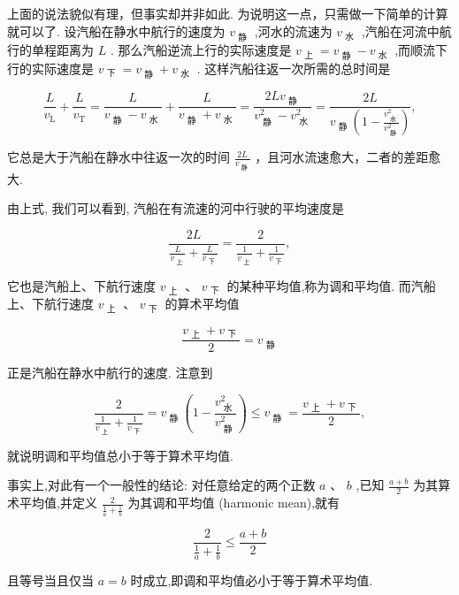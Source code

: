 \documentclass[10pt]{article}
\begin{document}
上面的说法貌似有理，但事实却并非如此. 为说明这一点，只需做一下简单的计算就可以了. 设汽船在静水中航行的速度为 \({v}_{\text{ 静 }}\) ,河水的流速为 \({v}_{\text{ 水 }}\) ,汽船在河流中航行的单程距离为 \(L\) . 那么汽船逆流上行的实际速度是 \({v}_{\mathrm{\text{ 上 }}} = {v}_{\text{ 静 }} - {v}_{\text{ 水 }}\) ,而顺流下行的实际速度是 \({v}_{\mathrm{\text{ 下 }}} = {v}_{\text{ 静 }} + {v}_{\text{ 水 }}\) . 这样汽船往返一次所需的总时间是

\[
\frac{L}{{v}_{\mathrm{L}}} + \frac{L}{{v}_{\mathrm{T}}} = \frac{L}{{v}_{\mathrm{\text{ 静 }}} - {v}_{\mathrm{\text{ 水 }}}} + \frac{L}{{v}_{\mathrm{\text{ 静 }}} + {v}_{\mathrm{\text{ 水 }}}} = \frac{{2L}{v}_{\mathrm{\text{ 静 }}}}{{v}_{\mathrm{\text{ 静 }}}^{2} - {v}_{\mathrm{\text{ 水 }}}^{2}} = \frac{2L}{{v}_{\mathrm{\text{ 静 }}}\left( {1 - \frac{{v}_{\mathrm{\text{ 水 }}}^{2}}{{v}_{\mathrm{\text{ 静 }}}^{2}}}\right) },
\]

它总是大于汽船在静水中往返一次的时间 \(\frac{2L}{{v}_{\text{ 静 }}}\) ，且河水流速愈大，二者的差距愈大.

由上式, 我们可以看到, 汽船在有流速的河中行驶的平均速度是

\[
\frac{2L}{\frac{L}{{v}_{\mathrm{\text{ 上 }}}} + \frac{L}{{v}_{\mathrm{\text{ 下 }}}}} = \frac{2}{\frac{1}{{v}_{\mathrm{\text{ 上 }}}} + \frac{1}{{v}_{\mathrm{\text{ 下 }}}}},
\]

它也是汽船上、下航行速度 \({v}_{\text{ 上 }}\text{ 、 }{v}_{\text{ 下 }}\) 的某种平均值,称为调和平均值. 而汽船上、下航行速度 \({v}_{\text{ 上 }}\text{ 、 }{v}_{\text{ 下 }}\) 的算术平均值

\[
\frac{{v}_{\text{ 上 }} + {v}_{\text{ 下 }}}{2} = {v}_{\text{ 静 }}
\]

正是汽船在静水中航行的速度. 注意到

\[
\frac{2}{\frac{1}{{v}_{\mathrm{\text{ 上 }}}} + \frac{1}{{v}_{\mathrm{\text{ 下 }}}}} = {v}_{\text{ 静 }}\left( {1 - \frac{{v}_{\text{ 水 }}^{2}}{{v}_{\text{ 静 }}^{2}}}\right)  \leq  {v}_{\text{ 静 }} = \frac{{v}_{\mathrm{\text{ 上 }}} + {v}_{\mathrm{\text{ 下 }}}}{2},
\]

就说明调和平均值总小于等于算术平均值.

事实上,对此有一个一般性的结论: 对任意给定的两个正数 \(a\text{ 、 }b\) ,已知 \(\frac{a + b}{2}\) 为其算术平均值,并定义 \(\frac{2}{\frac{1}{a} + \frac{1}{b}}\) 为其调和平均值 (harmonic mean),就有

\[
\frac{2}{\frac{1}{a} + \frac{1}{b}} \leq  \frac{a + b}{2}
\]

且等号当且仅当 \(a = b\) 时成立,即调和平均值必小于等于算术平均值.
\end{document}
